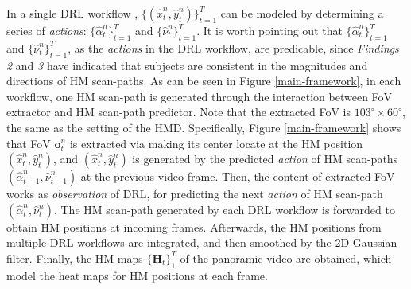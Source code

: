 \documentclass[10pt,journal,compsoc]{IEEEtran}
\begin{document}
In a single DRL workflow , $\{(\hat{x}^n_t, \hat{y}^n_t)\}_{t=1}^T$ can be modeled by determining a series of \textit{actions}: $\{\hat{\alpha}^n_t\}_{t=1}^T$ and $\{\hat{\nu}^n_t\}_{t=1}^T$.
It is worth pointing out that $\{\hat{\alpha}^n_t\}_{t=1}^{T}$ and $\{\hat{\nu}^n_t\}_{t=1}^{T}$, as the \textit{actions} in the DRL workflow, are predicable, since \textit{Findings 2} and \textit{3} have indicated that subjects are consistent in the magnitudes and directions of HM scan-paths.
As can be seen in Figure \ref{main-framework}, in each workflow, one HM scan-path is generated through the interaction between FoV extractor and HM scan-path predictor.
Note that the extracted FoV is $103^{\circ} \times 60^{\circ}$, the same as the setting of the HMD.
Specifically, Figure \ref{main-framework} shows that FoV $\mathbf{o}^n_t$ is extracted via making its center locate at the HM position $(\hat{x}^n_t,\hat{y}^n_t)$, and $(\hat{x}^n_t,\hat{y}^n_t)$ is generated by the predicted \textit{action} of HM scan-paths $(\hat{\alpha}^n_{t-1},\hat{\nu}^n_{t-1})$ at the previous video frame.
Then, the content of extracted FoV works as \textit{observation} of DRL, for predicting the next \textit{action} of HM scan-path $(\hat{\alpha}^n_{t},\hat{\nu}^n_{t})$.
The HM scan-path generated by each DRL workflow is forwarded to obtain HM positions at incoming frames.
Afterwards, the HM positions from multiple DRL workflows are integrated, and then smoothed by the 2D Gaussian filter.
Finally, the HM maps $\{\mathbf{H}_t\}_1^{T}$ of the panoramic video are obtained, which model the heat maps for HM positions at each frame.

%
\end{document}
